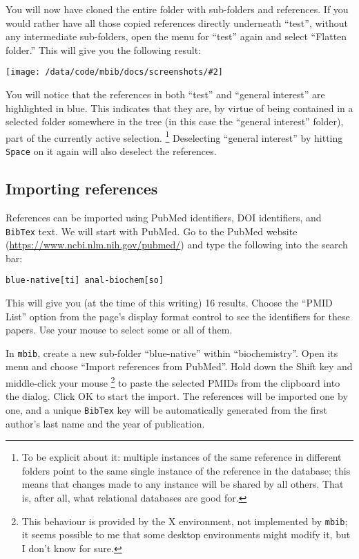 \documentclass[10pt]{article}
\newcommand*{\mbib}{\texttt{mbib}\xspace}
\newcommand*{\bibtex}{\texttt{BibTex}\xspace}
\newcommand*{\key}[1]{\texttt{#1}\xspace}
\newcommand{\screenshot}[2][]{%
\medskip\par
\begin{center}
\texttt{[image: /data/code/mbib/docs/screenshots/\#2]}
\end{center}}
\begin{document}
You will now have cloned the entire folder with sub-folders and references. If you would rather have all those copied references directly underneath ``test'', without any intermediate sub-folders, open the menu for ``test'' again and select ``Flatten folder.'' This will give you the following result:

\screenshot{flatten-folder}

\noindent You will notice that the references in both ``test'' and ``general interest'' are highlighted in blue. This indicates that they are, by virtue of being contained in a selected folder somewhere in the tree (in this case the ``general interest'' folder), part of the currently active selection.%
%
\footnote{To be explicit about it: multiple instances of the same reference in different folders point to the same single instance of the reference in the database; this means that changes made to any instance will be shared by all others. That is, after all, what relational databases are good for.}
%
Deselecting ``general interest'' by hitting \key{Space} on it again will also deselect the references. 

\subsection{Importing references}

References can be imported using PubMed identifiers, DOI identifiers, and \bibtex text. We will start with PubMed. Go to the PubMed website (\url{https://www.ncbi.nlm.nih.gov/pubmed/}) and type the following into the search bar:

\begin{verbatim}
blue-native[ti] anal-biochem[so]
\end{verbatim}

This will give you (at the time of this writing) 16 results. Choose the ``PMID List'' option from the page's display format control to see the identifiers for these papers. Use your mouse to select some or all of them. 

In \mbib, create a new sub-folder ``blue-native'' within ``biochemistry''. Open its menu and choose ``Import references from PubMed''. Hold down the Shift key and middle-click your mouse%
%
\footnote{This behaviour is provided by the X environment, not implemented by \mbib; it seems possible to me that some desktop environments might modify it, but I don't know for sure.}
%
to paste the selected PMIDs from the clipboard into the dialog. Click OK to start the import. The references will be imported one by one, and a unique \bibtex key will be automatically generated from the first author's last name and the year of publication. 
\end{document}

